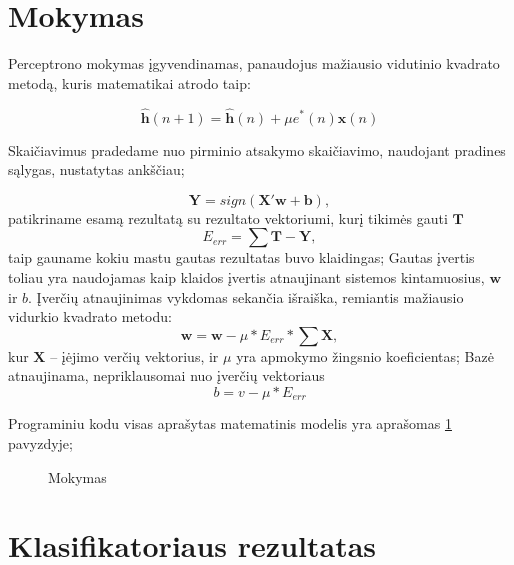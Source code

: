 \documentclass[11pt, a4paper, lithuanian]{article}
\begin{document}
    \section{Mokymas}

        Perceptrono mokymas įgyvendinamas, panaudojus mažiausio vidutinio kvadrato metodą, kuris matematikai atrodo taip:

        \begin{equation}
            \mathbf{\hat{h}}(n+1) = \mathbf{\hat{h}}(n) + \mu e^*(n)\mathbf{x}(n)
        \end{equation}

        Skaičiavimus pradedame nuo pirminio atsakymo skaičiavimo, naudojant pradines sąlygas, nustatytas ankščiau;

        \begin{equation}
            \mathbf{Y} = sign(\mathbf{X}'\mathbf{w} + \mathbf{b}),
        \end{equation}
        patikriname esamą rezultatą su rezultato vektoriumi, kurį tikimės gauti $\mathbf{T}$
        \begin{equation}
            E_{err} = \sum \mathbf{T} - \mathbf{Y},
        \end{equation}
        taip gauname kokiu mastu gautas rezultatas buvo klaidingas; Gautas įvertis toliau yra naudojamas kaip klaidos įvertis atnaujinant sistemos kintamuosius, $\mathbf{w}$ ir $b$. Įverčių atnaujinimas vykdomas sekančia išraiška, remiantis mažiausio vidurkio kvadrato metodu:
        \begin{equation}
            \mathbf{w} = \mathbf{w} - \mu*E_{err}*\sum\mathbf{X},
        \end{equation}
        kur $\mathbf{X}$ -- įėjimo verčių vektorius, ir $\mu$ yra apmokymo žingsnio koeficientas; Bazė atnaujinama, nepriklausomai nuo įverčių vektoriaus
        \begin{equation}
            b = v - \mu*E_{err}
        \end{equation}

        Programiniu kodu visas aprašytas matematinis modelis yra aprašomas \ref{code:mokymas} pavyzdyje;

        \begin{figure}[h]
            \centering
            \caption{Mokymas}
            \label{code:mokymas}
            
        \end{figure}

    \section{Klasifikatoriaus rezultatas}
\end{document}

